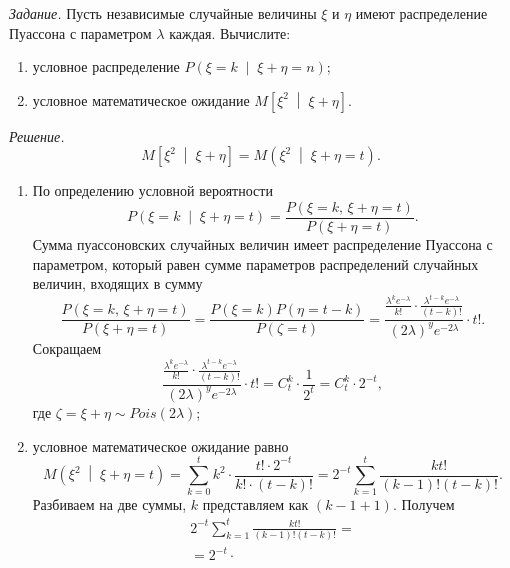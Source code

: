 \textit{Задание.}
Пусть независимые случайные величины $ \xi $ и $ \eta $ имеют распределение Пуассона с
параметром $ \lambda $ каждая.
Вычислите:
\begin{enumerate}[label=\alph*)]
  \item условное распределение $P \left( \xi = k \; \middle| \; \xi + \eta = n \right) $;
  \item условное математическое ожидание $M \left[ \xi^2 \; \middle| \; \xi + \eta \right] $.
\end{enumerate}

\textit{Решение.}
$$M \left[ \xi^2 \; \middle| \; \xi + \eta \right] =
  M \left( \xi^2 \; \middle| \; \xi + \eta = t \right).$$

\begin{enumerate}[label=\alph*)]
  \item По определению условной вероятности
  $$P \left( \xi = k \; \middle| \; \xi + \eta = t \right) =
    \frac{P \left( \xi = k, \, \xi + \eta = t \right) }{P \left( \xi + \eta = t \right) }.$$
  Сумма пуассоновских случайных величин имеет распределение Пуассона с параметром,
  который равен сумме параметров распределений случайных величин, входящих в сумму
  $$ \frac{P \left( \xi = k, \, \xi + \eta = t \right) }{P \left( \xi + \eta = t \right) } =
    \frac{P \left( \xi = k \right) P \left( \eta = t - k \right) }{P \left( \zeta = t \right) } =
    \frac{ \frac{ \lambda^k e^{- \lambda }}{k!} \cdot \frac{ \lambda^{t - k} e^{- \lambda }}{ \left( t - k \right)!}}{ \left( 2 \lambda \right)^y e^{-2 \lambda }} \cdot
    t!.$$
  Сокращаем
  $$ \frac{ \frac{ \lambda^k e^{- \lambda }}{k!} \cdot \frac{ \lambda^{t - k} e^{- \lambda }}{ \left( t - k \right)!}}{ \left( 2 \lambda \right)^y e^{-2 \lambda }} \cdot
    t! =
    C_t^k \cdot \frac{1}{2^t} =
    C_t^k \cdot 2^{-t},$$
  где $ \zeta = \xi + \eta \sim Pois \left( 2 \lambda \right) $;
  \item условное математическое ожидание равно
  $$M \left( \xi^2 \; \middle| \; \xi + \eta = t \right) =
    \sum \limits_{k = 0}^t k^2 \cdot \frac{t! \cdot 2^{-t}}{k! \cdot \left( t - k \right)!} =
    2^{-t} \sum \limits_{k = 1}^t \frac{kt!}{ \left( k - 1 \right)! \left( t - k \right)!}.$$
  Разбиваем на две суммы, $k$ представляем как $\left( k - 1 + 1 \right) $.
  Получем
  \begin{equation*}
    \begin{split}
      2^{-t} \sum \limits_{k = 1}^t \frac{kt!}{ \left( k - 1 \right)! \left( t - k \right)!} = \\
      = 2^{-t} \cdot

\end{split}
\end{equation*}
\end{enumerate}
